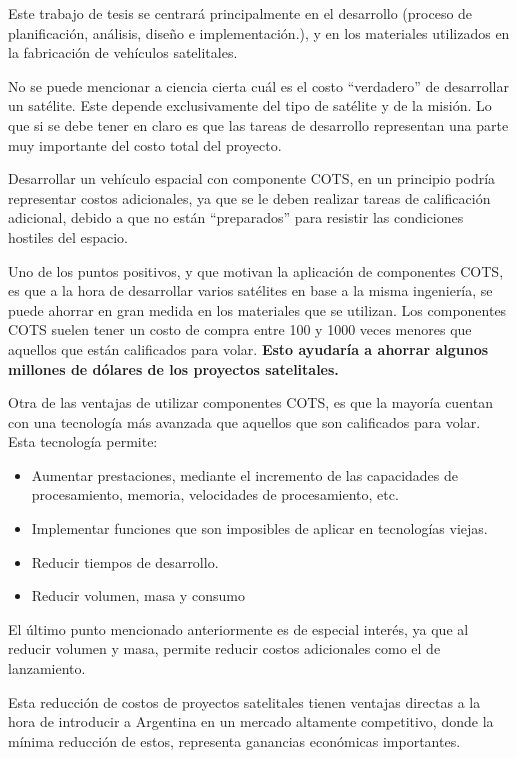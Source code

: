 Este trabajo de tesis se centrará principalmente en el desarrollo (proceso de planificación, 
análisis, diseño e implementación.), y en los materiales utilizados en la fabricación de vehículos satelitales.

No se puede mencionar a ciencia cierta cuál es el costo “verdadero” de desarrollar un satélite. Este 
depende exclusivamente del tipo de satélite y de la misión. Lo que si se debe tener en claro es que 
las tareas de desarrollo representan una parte muy importante del costo total del proyecto.

Desarrollar un vehículo espacial con componente \ac{COTS}, en un principio podría representar costos 
adicionales, ya que se le deben realizar tareas de calificación adicional, debido a que no están 
“preparados” para resistir las condiciones hostiles del espacio. 

Uno de los puntos positivos, y que motivan la aplicación de componentes COTS, es que a la hora de 
desarrollar varios satélites en base a la misma ingeniería, se puede ahorrar en gran medida en los 
materiales que se utilizan. Los componentes \ac{COTS} suelen tener un costo de compra entre 100 y 1000 
veces menores que aquellos que están calificados para volar. \textbf{Esto ayudaría a ahorrar 
algunos millones de dólares de los proyectos satelitales.}
  
Otra de las ventajas de utilizar componentes \ac{COTS}, es que la mayoría cuentan con una tecnología más 
avanzada que aquellos que son calificados para volar. Esta tecnología permite:
\begin{itemize}
 \item Aumentar prestaciones, mediante el incremento de las capacidades de procesamiento, memoria, 
velocidades de 
procesamiento, etc.
 \item Implementar funciones que son imposibles de aplicar en tecnologías viejas.
 \item Reducir tiempos de desarrollo.
 \item Reducir volumen, masa y consumo
\end{itemize}

El último punto mencionado anteriormente es de especial interés, ya que al reducir volumen y masa, 
permite reducir costos adicionales como el de lanzamiento.

Esta reducción de costos de proyectos satelitales tienen ventajas directas a la hora de introducir a 
Argentina en un mercado altamente competitivo, donde la mínima reducción de estos, representa 
ganancias económicas importantes. 
 
